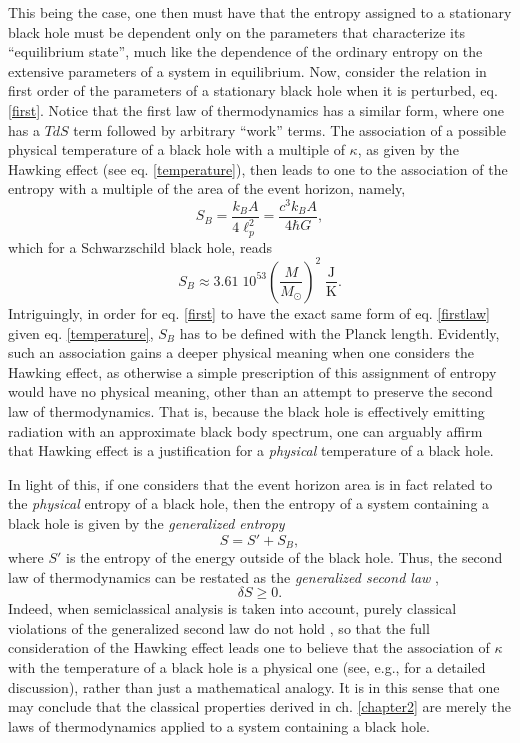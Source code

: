 \documentclass[
12pt,		%
openright,	%
twoside,  %
a4paper,			%
chapter=TITLE,		%
english,			%
french,				%
spanish,			%
brazil				%
]{USPSC-classe/USPSC}
\begin{document}
This being the case, one then must have that the entropy assigned to a stationary black hole must be dependent only on the parameters that characterize its ``equilibrium state'', much like the dependence of the ordinary entropy on the extensive parameters of a system in equilibrium. Now, consider the relation in first order of the parameters of a stationary black hole when it is perturbed, eq. \ref{first}. Notice that the first law of thermodynamics has a similar form, where one has a $TdS$ term followed by arbitrary ``work'' terms. The association of a possible physical temperature of a black hole with a multiple of $\kappa$, as given by the Hawking effect (see eq. \ref{temperature}), then leads to one to the association of the entropy with a multiple of the area of the event horizon, namely, 
\begin{equation}\label{entropy}
    S_B=\frac{k_B A}{4\ell_p^2}=\frac{c^3k_BA}{4\hbar G},
\end{equation}
which for a Schwarzschild black hole, reads
\begin{equation}
    S_B\approx 3.61\;10^{53}\left(\frac{M}{M_\odot}\right)^2\;\frac{\text{J}}{\text{K}}.
\end{equation}
Intriguingly, in order for eq. \ref{first} to have the exact same form of eq. \ref{firstlaw} given eq. \ref{temperature}, $S_B$ has to be defined with the Planck length. Evidently, such an association gains a deeper physical meaning when one considers the Hawking effect, as otherwise a simple prescription of this assignment of entropy would have no physical meaning, other than an attempt to preserve the second law of thermodynamics. That is, because the black hole is effectively emitting radiation with an approximate black body spectrum, one can arguably affirm that Hawking effect is a justification for a \textit{physical} temperature of a black hole. 

In light of this, if one considers that the event horizon area is in fact related to the \textit{physical} entropy of a black hole, then the entropy of a system containing a black hole is given by the \textit{generalized entropy}
\begin{equation}
    S=S'+S_B,
\end{equation}
where $S'$ is the entropy of the energy outside of the black hole. Thus, the second law of thermodynamics can be restated as the \textit{generalized second law} \cite{Bekenstein1972},
\begin{equation}
    \delta S\geq0.
\end{equation}
Indeed, when semiclassical analysis is taken into account, purely classical violations of the generalized second law do not hold \cite{Wald1984}, so that the full consideration of the Hawking effect leads one to believe that the association of $\kappa$ with the temperature of a black hole is a physical one (see, e.g., \cite{Matsas2005} for a detailed discussion), rather than just a mathematical analogy. It is in this sense that one may conclude that the classical properties derived in ch. \ref{chapter2} are merely the laws of thermodynamics applied to a system containing a black hole.
\end{document}
